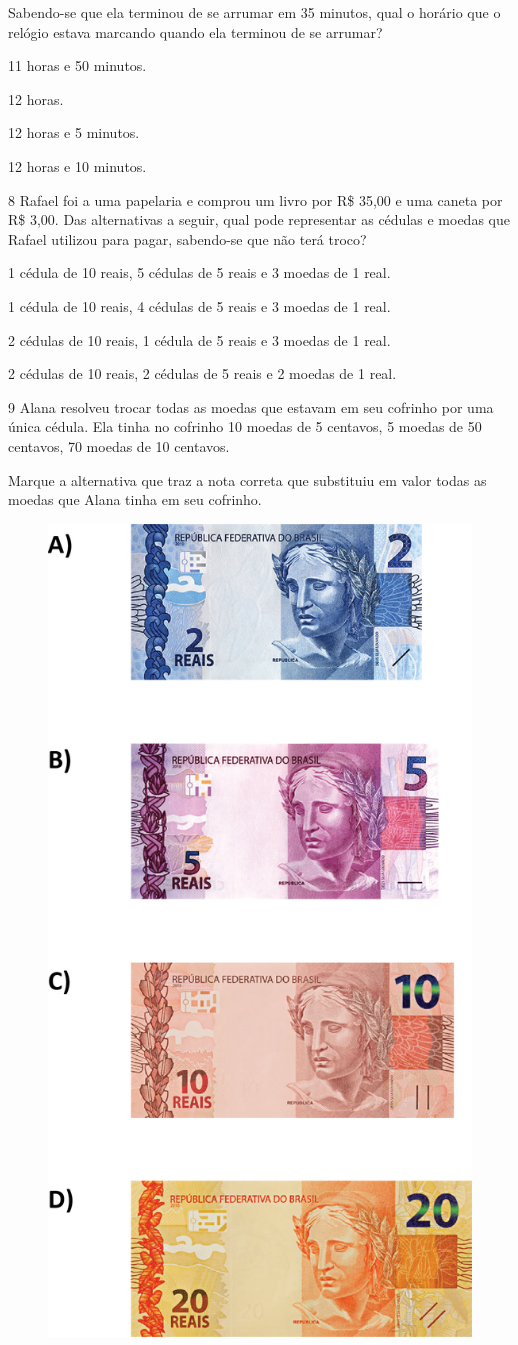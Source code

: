 \pagebreak
Sabendo-se que ela terminou de se arrumar em 35 minutos, qual o horário que o relógio estava marcando quando ela terminou de se arrumar?

\begin{escolha}
\item
  11 horas e 50 minutos.
\item
  12 horas.
\item
  12 horas e 5 minutos.
\item
  12 horas e 10 minutos.
\end{escolha}


\num{8} Rafael foi a uma papelaria e comprou um livro por R\$ 35,00 e uma caneta
por R\$ 3,00. Das alternativas a seguir, qual pode representar as cédulas
e moedas que Rafael utilizou para pagar, sabendo-se que não terá troco?

\begin{escolha}

\item
  1 cédula de 10 reais, 5 cédulas de 5 reais e 3 moedas de 1 real.
\item
  1 cédula de 10 reais, 4 cédulas de 5 reais e 3 moedas de 1 real.
\item
  2 cédulas de 10 reais, 1 cédula de 5 reais e 3 moedas de 1 real.
\item
  2 cédulas de 10 reais, 2 cédulas de 5 reais e 2 moedas de 1 real.
\end{escolha}


\num{9} Alana resolveu trocar todas as moedas que estavam em seu cofrinho por uma única cédula. Ela tinha no cofrinho 10 moedas de 5 centavos, 5 moedas de
50 centavos, 70 moedas de 10 centavos.

\pagebreak
Marque a alternativa que traz a nota correta que substituiu em valor todas as moedas que Alana tinha em seu cofrinho.

\begin{figure}[htpb!]
\includegraphics[width=.45\textwidth]{./media/image117.png}
\end{figure}


